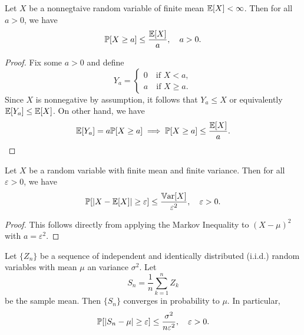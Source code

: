 \documentclass[11pt,a4paper]{article}
\begin{document}
\begin{lemma}
    Let $X$ be a nonnegtaive random variable of finite mean $\mathbb{E}[X]<\infty$. Then for all $a>0$, we have
    \begin{equation*}
        \mathbb{P}[X\ge a] \le \dfrac{\mathbb{E}[X]}{a},\quad a > 0.
    \end{equation*}
\end{lemma}

\begin{proof}
    Fix some $a > 0$ and define 
    \begin{equation*}
        Y_a = \begin{cases}
            0\quad\text{if } X<a, \\
            a\quad\text{if } X\ge a.
        \end{cases}
    \end{equation*}
    Since $X$ is nonnegative by assumption, it follows that $Y_a \le X$ or equivalently $\mathbb{E}[Y_a] \le \mathbb{E}[X]$. On other hand, we have
    \begin{equation*}
        \mathbb{E}[Y_a] = a \mathbb{P}[X \ge a] \implies \mathbb{P}[X\ge a] \le \dfrac{\mathbb{E}[X]}{a}. 
    \end{equation*}
\end{proof}

\begin{lemma}
    Let $X$ be a random variable with finite mean and finite variance. Then for all $\varepsilon>0$, we have
    \begin{equation*}
        \mathbb{P}[|X-\mathbb{E}[X]|\ge \varepsilon] \le \dfrac{\mathbb{V}\text{ar}[X]}{\varepsilon^2},\quad \varepsilon > 0.
    \end{equation*}
\end{lemma}

\begin{proof}
    This follows directly from applying the Markov Inequality to $(X-\mu)^2$ with $a = \varepsilon^2$. 
\end{proof}

\begin{lemma}
    Let $\{Z_n\}$ be a sequence of independent and identically distributed (i.i.d.) random variables with mean $\mu$ an variance $\sigma^2$. Let 
    \begin{equation*}
        S_n = \dfrac{1}{n}\sum_{k=1}^n Z_k
    \end{equation*}
    be the sample mean. Then $\{S_n\}$ converges in probability to $\mu$. In particular, 
    \begin{equation*}
        \mathbb{P}[|S_n-\mu|\ge \varepsilon] \le \dfrac{\sigma^2}{n\varepsilon^2},\quad \varepsilon > 0.
    \end{equation*}
\end{lemma}
\end{document}
